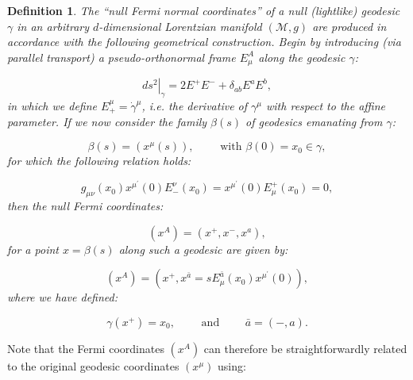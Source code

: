 \documentclass{article}
\newtheorem{definition}{Definition}
\begin{document}
\begin{definition}
The ``null Fermi normal coordinates'' of a null (lightlike) geodesic ${\gamma}$ in an arbitrary $d$-dimensional Lorentzian manifold ${\left( \mathcal{M}, g \right)}$ are produced in accordance with the following geometrical construction. Begin by introducing (via parallel transport) a pseudo-orthonormal frame ${E_{\mu}^{A}}$ along the geodesic ${\gamma}$:

\begin{equation}
\left. d s^2 \right\rvert_{\gamma} = 2 E^{+} E^{-} +\delta_{a b} E^a E^b,
\end{equation}
in which we define ${E_{+}^{\mu} = \dot{\gamma}^{\mu}}$, i.e. the derivative of ${\gamma^{\mu}}$ with respect to the affine parameter. If we now consider the family ${\beta \left( s \right)}$ of geodesics emanating from ${\gamma}$:

\begin{equation}
\beta \left( s \right) = \left( x^{\mu} \left( s \right) \right), \qquad \text{ with } \beta \left( 0 \right) = x_0 \in \gamma,
\end{equation}
for which the following relation holds:

\begin{equation}
g_{\mu \nu} \left( x_0 \right) x^{\mu^{\prime}} \left( 0 \right) E_{-}^{\nu} \left( x_0 \right) = x^{\mu^{\prime}} \left( 0 \right) E_{\mu}^{+} \left( x_0 \right) = 0,
\end{equation}
then the null Fermi coordinates:

\begin{equation}
\left( x^A \right) = \left( x^{+}, x^{-}, x^{a} \right),
\end{equation}
for a point ${x = \beta \left( s \right)}$ along such a geodesic are given by:

\begin{equation}
\left( x^A \right) = \left( x^{+}, x^{\bar{a}} = s E_{\mu}^{\bar{a}} \left( x_0 \right) x^{\mu^{\prime}} \left( 0 \right) \right),
\end{equation}
where we have defined:

\begin{equation}
\gamma \left( x^{+} \right) = x_0, \qquad \text{ and } \qquad \bar{a} = \left( -, a \right).
\end{equation}
\end{definition}
Note that the Fermi coordinates ${\left( x^A \right)}$ can therefore be straightforwardly related to the original geodesic coordinates ${\left( x^{\mu} \right)}$ using:
\end{document}
